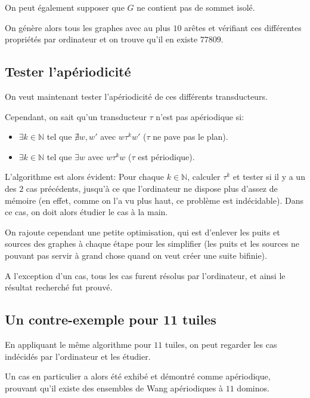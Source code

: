 \documentclass{scrartcl}
\newcommand{\N}{\mathbb N}
\theoremstyle{definition}
\theoremstyle{remark}
\begin{document}
On peut également supposer que $G$ ne contient pas de sommet isolé.

On génère alors tous les graphes avec au plus $10$ arêtes et vérifiant ces différentes propriétés par ordinateur
et on trouve qu'il en existe $77809$.

\subsection{Tester l'apériodicité}

On veut maintenant tester l'apériodicité de ces différents transducteurs.

Cependant, on sait qu'un transducteur $\tau$ n'est pas apériodique si:

\begin{itemize}
    \item $\exists k \in \N$ tel que $\nexists w,w'$ avec $w \tau^k w'$ ($\tau$ ne pave pas le plan).
    \item $\exists k \in \N$ tel que $\exists w$ avec $w \tau^k w$ ($\tau$ est périodique).
\end{itemize}

L'algorithme est alors évident: Pour chaque $k \in \N$, calculer $\tau^k$ et tester si il y a un des $2$ cas précédents,
jusqu'à ce que l'ordinateur ne dispose plus d'assez de mémoire (en effet, comme on l'a vu plus haut, ce problème est indécidable).
Dans ce cas, on doit alors étudier le cas à la main.

On rajoute cependant une petite optimisation, qui est d'enlever les puits et sources des graphes à chaque étape pour les simplifier
(les puits et les sources ne pouvant pas servir à grand chose quand on veut créer une suite bifinie).

A l'exception d'un cas, tous les cas furent résolus par l'ordinateur, et ainsi le résultat recherché fut prouvé.

\subsection{Un contre-exemple pour 11 tuiles}
En appliquant le même algorithme pour $11$ tuiles, on peut regarder les cas indécidés par l'ordinateur et les étudier.

Un cas en particulier a alors été exhibé et démontré comme apériodique, prouvant qu'il existe des ensembles de Wang
apériodiques à $11$ dominos.
\end{document}
